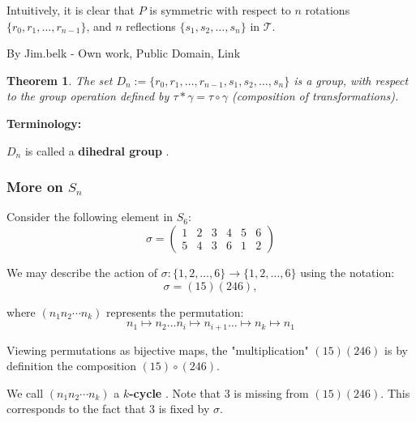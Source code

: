 \documentclass[a4paper,12pt]{report}
\newcommand{\ra}{\longrightarrow}
\newcounter{statement}
\numberwithin{statement}{chapter}
\newtheorem{thm}[statement]{Theorem}
\numberwithin{equation}{chapter}
\numberwithin{section}{chapter}
\numberwithin{subsection}{section}
\begin{document}
Intuitively, it is clear that $P$ is symmetric with respect to $n$ rotations $\{r_0, r_1,\ldots, r_{n - 1}\}$,
and $n$ reflections $\{s_1, s_2,\ldots, s_n\}$ in $\mathcal{T}$.









By Jim.belk - Own work, Public Domain, Link







\begin{thm}

The set $D_n := \{r_0, r_1,\ldots, r_{n - 1}, s_1, s_2,\ldots, s_n\}$ is a group,
with respect to the group operation defined by $\tau*\gamma = \tau\circ\gamma$
(composition of transformations).

\end{thm}
 {\bf Terminology:} 

$D_n$ is called a  {\bf dihedral group} .





\subsubsection*{More on $S_n$}




Consider the following element in $S_6$:
\[
\sigma = \left(
\begin{matrix}
1&2&3&4&5&6\\
5&4&3&6&1&2
\end{matrix}
\right)
\]

We may describe the action of $\sigma : \{1, 2, \ldots, 6\} \ra \{1, 2, \ldots, 6\}$
using the notation:
\[
\sigma = (15)(246),
\]

where $(n_1 n_2\cdots n_k)$ represents the permutation:
\[
n_1 \mapsto n_2 \dots n_i \mapsto n_{i + 1} \dots \mapsto n_k \mapsto n_1
\]

Viewing permutations as bijective maps,
the "multiplication" $(15)(246)$ is by definition the composition $(15)\circ(246)$.




We call $(n_1n_2\cdots n_k)$ a  {\bf $k$-cycle} .
Note that $3$ is missing from $(15)(246)$.
This corresponds to the fact that $3$ is fixed by $\sigma$.
\end{document}
